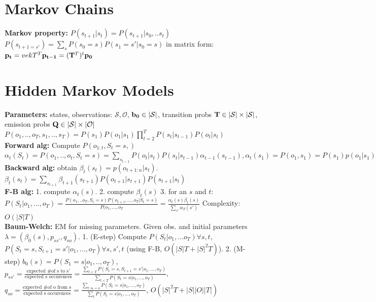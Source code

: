 \section{Markov Chains}
{\bf Markov property: } $P(s_{t+1} \vert s_t) = P(s_{t+1} \vert s_0, .. s_t)$ \\
 $P(s_{t+1 = s'}) = \sum_s P(s_0 = s) P(s_1 = s' \vert s_0 = s)$ in matrix form: $\mathbf{p_t} = vek{T}^T \mathbf{p_{t-1}} = (\mathbf{T}^T)^t\mathbf{p_0}$ 
 
 \section{Hidden Markov Models}
 
 {\bf Parameters: } states, observations: $\mathcal{S, O}$,  $\mathbf{b_0}  \in | \mathcal{S} |$, transition probs $\mathbf{T} \in | \mathcal{S} | \times | \mathcal{S} |$, emission probs $\mathbf{Q} \in |\mathcal{S}| \times |\mathcal{O}|$ \\
 $P(o_1, ..,o_T, s_1, .., s_T) = P(s_1)P(o_1 \vert s_1) \prod_{t=2}^T P(s_t \vert s_{t-1})P(o_t \vert s_t)$\\
 {\bf Forward alg:} Compute $P(o_{1:t}, S_t=s, )$ $\alpha_t(S_t) = P(o_1,..,o_t, S_t = s) = \sum_{s_{t-1}}P(o_{t} \vert s_{t}) P(s_{t} \vert s_{t-1}) \alpha_{t-1}(s_{t-1}), \alpha_{t}(s_1) = P(o_1, s_1) = P(s_1)p(o_1 \vert s_1)$\\
 {\bf Backward alg: } obtain $\beta_{t}(s_t) = p(o_{t+1:n} \vert s_t)$. $\beta_{t}(s_t) = \sum_{s_{t+1}} \beta_{t+1}(s_{t+1}) P(o_{t+1} \vert s_{t+1}) P(s_{t+1} \vert s_t)$\\
 {\bf F-B alg: } 1. compute $\alpha_{t}(s)$. 2. compute $\beta_{t}(s)$ 3. for an $s$ and $t$: $P(S_t \vert o_1, ..., o_T) = \frac{P(o_1, .. o_T, S_t = s) P(o_{t+1}, ..., o_T \vert S_t = s)}{P(o_1, ..., o_T} = \frac{\alpha_{t}(s) \beta_{t}(s)}{\sum_{s'}\alpha_{T}(s')}$ Complexity: $O(|S|T)$\\
 {\bf Baum-Welch:} EM for missing parameters. Given obs. and initial parameters $\lambda = (\beta_0(s), p_{ss'}, q_{so})$. 1. (E-step) Compute $P(S_t \vert o_1,...o_T) \forall s, t$, $P(S_t =s, S_{t+1} = s' \vert o_1, ..., o_T) \forall s, s', t$ (using F-B, $O(|S|T + |S|^2T)$). 2. (M-step) $b_0(s) = P(S_1 = s \vert o_1, .., o_T)$, $p_{ss'} = \frac{\text{expected \# of s to s'}}{\text{expected s occurences}} = \frac{\sum_{t<T} P(S_t = s, S_{t+1} = s' \vert o_1, ..., o_T)}{ \sum_{t<T} P(S_t =s \vert o_1, ..., o_T)}$, $q_{so} = \frac{\text{expected \# of o from s}}{\text{expected s occurences}} = \frac{\sum_{t:o_t=o} P(S_t = s \vert o_1, ..., o_T)}{ \sum_{t} P(S_t =s \vert o_1, ..., o_T)}$, $O(|S|^2T + |S||O||T|)$\\
 
